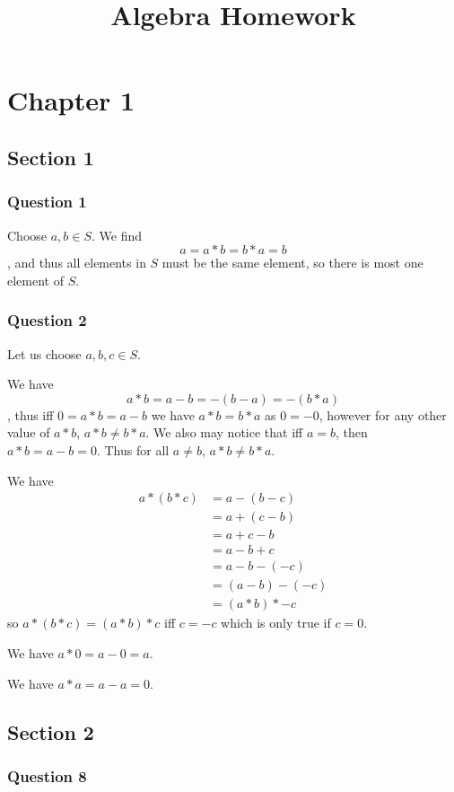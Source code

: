 \documentclass{article}
\title{Algebra Homework}
\begin{document}
\maketitle
\tableofcontents

\section{Chapter 1}
\subsection{Section 1}
\subsubsection{Question 1}

Choose $a,b\in S$. We find $$a = a * b = b * a = b$$, and thus all elements in $S$ must be the same element, so there is most one element of $S$.

\subsubsection{Question 2}
Let us choose $a,b,c \in S$.

 We have $$a*b = a - b = -(b-a) = -(b*a)$$, thus iff $0 = a*b = a-b$ we have $a*b = b*a$ as $0=-0$, however for any other value of $a*b$, $a*b\not=b*a$. We also may notice that iff $a=b$, then $a*b=a-b=0$. Thus for all $a\not= b$, $a*b \not=b*a$.

 We have
\begin{align*}
a*(b*c) &= a-(b-c) \\
&= a+(c-b) \\
&= a+c-b \\
&= a-b+c \\
&= a-b-(-c) \\
&= (a-b)-(-c) \\
&= (a*b)*-c
\end{align*} so $a*(b*c) = (a*b)*c$ iff $c=-c$ which is only true if $c = 0$.

 We have $a*0 = a-0 = a$.

 We have $a*a = a-a = 0$.

\subsection{Section 2}

\subsubsection{Question 8}
\end{document}
